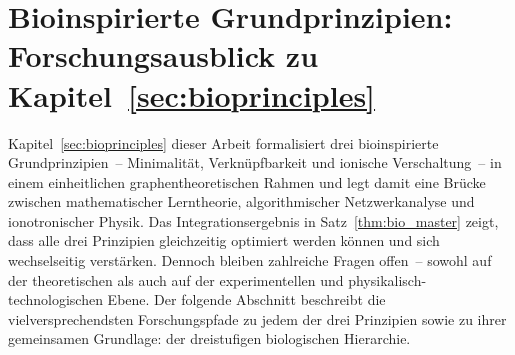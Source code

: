 ﻿\documentclass[12pt, a4paper, openany]{report}
\begin{document}
\section{Bioinspirierte Grundprinzipien: Forschungsausblick zu
  Kapitel~\ref{sec:bioprinciples}}
\label{sec:outlook_bioprinciples}

Kapitel~\ref{sec:bioprinciples} dieser Arbeit formalisiert drei
bioinspirierte Grundprinzipien~-- Minimalität, Verknüpfbarkeit und ionische
Verschaltung~-- in einem einheitlichen graphentheoretischen Rahmen und legt
damit eine Brücke zwischen mathematischer Lerntheorie, algorithmischer
Netzwerkanalyse und ionotronischer Physik.  Das Integrationsergebnis in
Satz~\ref{thm:bio_master} zeigt, dass alle drei Prinzipien gleichzeitig
optimiert werden können und sich wechselseitig verstärken.  Dennoch bleiben
zahlreiche Fragen offen~-- sowohl auf der theoretischen als auch auf der
experimentellen und physikalisch-technologischen Ebene.  Der folgende
Abschnitt beschreibt die vielversprechendsten Forschungspfade zu jedem der
drei Prinzipien sowie zu ihrer gemeinsamen Grundlage: der drei\-stu\-fi\-gen
biologischen Hierarchie.
\end{document}

